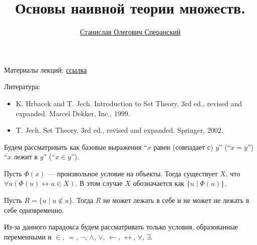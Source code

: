 \documentclass[12pt,a4paper]{article}
\title{Основы наивной теории множеств.}
\author{\href{https://users.math-cs.spbu.ru/~speranski}{Станислав Олегович Сперанский}}
\date{}
\begin{document}
    \maketitle

    Материалы лекций: \href{https://users.math-cs.spbu.ru/~speranski/courses/sets-2020-autumn/materials.html}{ссылка}
    
    Литература:
    \begin{itemize}
        \item K. Hrbacek and T. Jech. Introduction to Set Theory. 3rd ed., revised and expanded. Marcel Dekker, Inc., 1999.
        \item T. Jech. Set Theory. 3rd ed., revised and expanded. Springer, 2002.
    \end{itemize}

    Будем рассматривать как базовые выражения ``$x$ равен (совпадает с) $y$'' (``$x=y$'') ``$x$ лежит в $y$'' (``$x\in y$'').

    \begin{definition}
        Пусть $\Phi(x)$ --- произвольное условие на объекты. Тогда существует $X$, что $\forall u (\Phi(u) \leftrightarrow u \in X)$. В этом случае $X$ обозначается как $\{u \mid \Phi(u)\}$.
    \end{definition}

    \begin{statement}
        Пусть $R = \{u \mid u \notin u\}$. Тогда $R$ не может лежать в себе и не может не лежать в себе одновременно.
    \end{statement}

    Из-за данного парадокса будем рассматривать только условия, образованные переменными и $\in$, $=$, $\neg$, $\wedge$, $\vee$, $\leftarrow$, $\leftrightarrow$, $\forall$, $\exists$.
\end{document}
